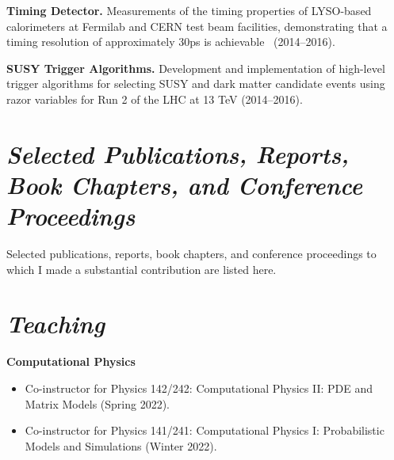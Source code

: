 \documentclass[11pt]{res}
\newcommand{\MarginText}[1]{\section{\textit{#1}}}
\begin{document}
\begin{resume}
{    \textbf{Timing Detector.} Measurements of the timing properties of LYSO-based calorimeters at Fermilab and CERN test beam facilities, demonstrating that a timing resolution of approximately 30\unit{ps} is achievable~\cite{Bornheim:2017gql,8069874,Anderson:2016tiu,Anderson:2016ygg,7581887,Anderson:2015gha,Anderson:2015tia,Bornheim_2015} ({2014--2016}).

    \textbf{SUSY Trigger Algorithms.} Development and implementation of high-level trigger algorithms for selecting SUSY and dark matter candidate events using razor variables for Run 2 of the LHC at 13 TeV  ({2014--2016}).

  }{}


  \MarginText{Selected Publications, Reports, Book Chapters, and Conference Proceedings}
  Selected publications, reports, book chapters, and conference proceedings to which I made a substantial contribution are listed here.\nocite{*}

  \vspace{11pt}
  \setlength\bibitemsep{\itemsep-0.3em}
  \printbibliography[heading=none,keyword={career}]


  \MarginText{Teaching}

  \textbf{Computational Physics}
  \begin{itemize}
    \itemsep-0.3em
    \item Co-instructor for Physics 142/242: Computational Physics II: PDE and Matrix Models ({Spring 2022}).
    \item Co-instructor for Physics 141/241: Computational Physics I: Probabilistic Models and Simulations ({Winter 2022}).
  \end{itemize}


\end{resume}
\end{document}
